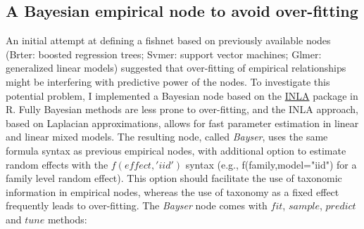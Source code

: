 \documentclass{dragonfly-report}
\begin{document}
\subsection{A Bayesian empirical node to avoid over-fitting}

An initial attempt at defining a fishnet based on previously available nodes (Brter: boosted regression trees; Svmer: support vector machines; Glmer: generalized linear models) suggested that over-fitting of empirical relationships might be interfering with predictive power of the nodes. To investigate this potential problem, I implemented a Bayesian node based on the \href{http://www.r-inla.org/}{INLA} package in R. Fully Bayesian methods are less prone to over-fitting, and the INLA approach, based on Laplacian approximations, allows for fast parameter estimation in linear and linear mixed models. The resulting node, called \emph{Bayser}, uses the same formula syntax as previous empirical nodes, with additional option to estimate random effects with the $f(effect, 'iid')$ syntax (e.g., f(family,model="iid") for a family level random effect). This option should facilitate the use of taxonomic information in empirical nodes, whereas the use of taxonomy as a fixed effect frequently leads to over-fitting. The \emph{Bayser} node comes with $fit$, $sample$, $predict$ and $tune$ methods:
\end{document}
